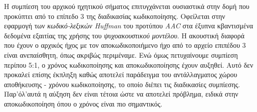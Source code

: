 Η συμπίεση του αρχικού ηχητικού σήματος επιτυγχάνεται ουσιαστικά στην δομή που
προκύπτει από το επίπεδο 3 της διαδικασίας κωδικοποίησης. Οφείλεται στην εφαρμογή
των \emph{κωδικό-λεξικών Huffman} του προτύπου \emph{AAC} στα έξυπνα κβαντισμένα
δεδομένα εξαιτίας της χρήσης του \emph{ψυχοακουστικού μοντέλου}. Η ακουστική
διαφορά που έχουν ο αρχικός ήχος με τον αποκωδικοποιήμενο ήχο από το αρχείο επιπέδου
3 είναι ανεπαίσθητη, όπως ακριβώς περιμέναμε. Ενώ όμως πετυχαίνουμε συμπίεση περίπου
5:1, ο χρόνος κωδικοποίησης και αποκωδικοποίησης έχουν αυξηθεί. Αυτό δεν προκαλεί
επίσης έκπληξη καθώς αποτελεί παράδειγμα του αντάλλαγματος χώρου αποθήκευσης -
χρόνου κωδικοποίησης, το οποίο διέπει τις διαδικασίες συμπίεσης. Παρ'όλ'αυτά η
αύξηση δεν είναι τέτοια ώστε να αποτελεί πρόβλημα, ειδικά στην αποκωδικοποίηση
όπου ο χρόνος είναι πιο σημαντικός.
